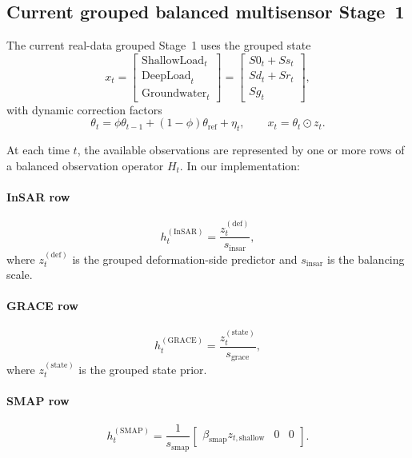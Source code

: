 \documentclass[11pt]{article}
\begin{document}
\subsection{Current grouped balanced multisensor Stage~1}

The current real-data grouped Stage~1 uses the grouped state
\begin{equation}
x_t =
\begin{bmatrix}
\mathrm{ShallowLoad}_t\\
\mathrm{DeepLoad}_t\\
\mathrm{Groundwater}_t
\end{bmatrix}
=
\begin{bmatrix}
S0_t + Ss_t\\
Sd_t + Sr_t\\
Sg_t
\end{bmatrix},
\end{equation}
with dynamic correction factors
\begin{equation}
\theta_t = \phi \theta_{t-1} + (1-\phi)\theta_{\mathrm{ref}} + \eta_t,
\qquad
x_t = \theta_t \odot z_t.
\end{equation}

At each time $t$, the available observations are represented by one or more rows of a balanced observation operator $H_t$. In our implementation:

\paragraph{InSAR row}
\begin{equation}
h_t^{(\mathrm{InSAR})}
=
\frac{z_t^{(\mathrm{def})}}{s_{\mathrm{insar}}},
\end{equation}
where $z_t^{(\mathrm{def})}$ is the grouped deformation-side predictor and $s_{\mathrm{insar}}$ is the balancing scale.

\paragraph{GRACE row}
\begin{equation}
h_t^{(\mathrm{GRACE})}
=
\frac{z_t^{(\mathrm{state})}}{s_{\mathrm{grace}}},
\end{equation}
where $z_t^{(\mathrm{state})}$ is the grouped state prior.

\paragraph{SMAP row}
\begin{equation}
h_t^{(\mathrm{SMAP})}
=
\frac{1}{s_{\mathrm{smap}}}
\begin{bmatrix}
\beta_{\mathrm{smap}} z_{t,\mathrm{shallow}} & 0 & 0
\end{bmatrix}.
\end{equation}
\end{document}
